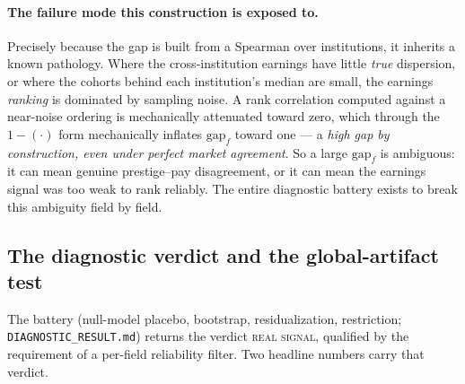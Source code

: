 \documentclass[11pt]{article}
\begin{document}
\paragraph{The failure mode this construction is exposed to.}
Precisely because the gap is built from a Spearman over institutions, it inherits a known pathology. Where the cross-institution earnings have little \emph{true} dispersion, or where the cohorts behind each institution's median are small, the earnings \emph{ranking} is dominated by sampling noise. A rank correlation computed against a near-noise ordering is mechanically attenuated toward zero, which through the $1-(\cdot)$ form mechanically inflates $\mathrm{gap}_f$ toward one --- a \emph{high gap by construction, even under perfect market agreement}. So a large $\mathrm{gap}_f$ is ambiguous: it can mean genuine prestige--pay disagreement, or it can mean the earnings signal was too weak to rank reliably. The entire diagnostic battery exists to break this ambiguity field by field.

\subsection{The diagnostic verdict and the global-artifact test}

The battery (null-model placebo, bootstrap, residualization, restriction; \texttt{DIAGNOSTIC\_RESULT.md}) returns the verdict \textsc{real signal}, qualified by the requirement of a per-field reliability filter. Two headline numbers carry that verdict.
\end{document}
